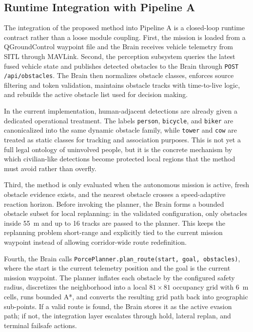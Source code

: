 \documentclass[a4paper,11pt]{article}
\begin{document}
\subsection{Runtime Integration with Pipeline A}

The integration of the proposed method into Pipeline A is a closed-loop runtime contract rather than a loose module coupling. First, the mission is loaded from a QGroundControl waypoint file and the Brain receives vehicle telemetry from SITL through MAVLink. Second, the perception subsystem queries the latest fused vehicle state and publishes detected obstacles to the Brain through \texttt{POST /api/obstacles}. The Brain then normalizes obstacle classes, enforces source filtering and token validation, maintains obstacle tracks with time-to-live logic, and rebuilds the active obstacle list used for decision making.

In the current implementation, human-adjacent detections are already given a dedicated operational treatment. The labels \texttt{person}, \texttt{bicycle}, and \texttt{biker} are canonicalized into the same dynamic obstacle family, while \texttt{tower} and \texttt{cow} are treated as static classes for tracking and association purposes. This is not yet a full legal ontology of uninvolved people, but it is the concrete mechanism by which civilian-like detections become protected local regions that the method must avoid rather than overfly.

Third, the method is only evaluated when the autonomous mission is active, fresh obstacle evidence exists, and the nearest obstacle crosses a speed-adaptive reaction horizon. Before invoking the planner, the Brain forms a bounded obstacle subset for local replanning: in the validated configuration, only obstacles inside \SI{55}{\meter} and up to 16 tracks are passed to the planner. This keeps the replanning problem short-range and explicitly tied to the current mission waypoint instead of allowing corridor-wide route redefinition.

Fourth, the Brain calls \texttt{PorcePlanner.plan\_route(start, goal, obstacles)}, where the start is the current telemetry position and the goal is the current mission waypoint. The planner inflates each obstacle by the configured safety radius, discretizes the neighborhood into a local \(81 \times 81\) occupancy grid with \SI{6}{\meter} cells, runs bounded A*, and converts the resulting grid path back into geographic sub-points. If a valid route is found, the Brain stores it as the active evasion path; if not, the integration layer escalates through hold, lateral replan, and terminal failsafe actions.
\end{document}
